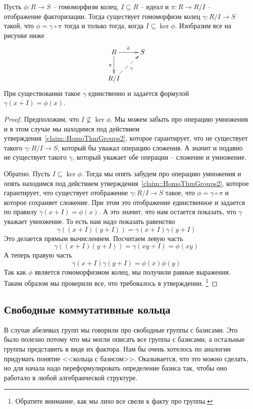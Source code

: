 \begin{claim}
Пусть $\phi\colon R\to S$ -- гомоморфизм колец, $I\subseteq R$ -- идеал и $\pi \colon R\to R/I$ -- отображение факторизации.
Тогда существует гомоморфизм колец $\gamma \colon R/I \to S$ такой, что $\phi = \gamma \circ \pi$ тогда и только тогда, когда $I 
\subseteq \ker \phi$.
Изобразим все на рисунке ниже
\[
\xymatrix{
	{R}\ar[r]^{\phi}\ar[d]_{\pi}&{S}\\
	{R/I}\ar@{-->}[ru]_{\gamma}&{}
}
\]
При существовании такое $\gamma$ единственно и задается формулой $\gamma(x + I) = \phi(x)$.
\end{claim}
\begin{proof}
Предположим, что $I\not\subseteq \ker \phi$.
Мы можем забыть про операцию умножения и в этом случае мы находимся под действием утверждения~\ref{claim::HomoThmGroups2}, которое гарантирует, что не существует такого $\gamma\colon R/I\to S$, который бы уважал операцию сложения.
А значит и подавно не существует такого $\gamma$, который уважает обе операции -- сложение и умножение.

Обратно.
Пусть $I\subseteq \ker \phi$.
Тогда мы опять забудем про операцию умножения и опять находимся под действием утверждения~\ref{claim::HomoThmGroups2}, которое гарантирует, что существует отображение $\gamma \colon R/I \to S$ такое, что $\phi = \gamma\circ \pi$ и которое сохраняет сложение.
При этом это отображение единственное и задается по правилу $\gamma(x + I) = \phi(x)$.
А это значит, что нам остается показать, что $\gamma$ уважает умножение.
То есть нам надо показать равенство
\[
\gamma((x+I) (y+I)) = \gamma(x + I) \gamma(y + I)
\]
Это делается прямым вычислением.
Посчитаем левую часть
\[
\gamma((x+I) (y+I)) = \gamma(xy + I) = \phi(xy)
\]
А теперь правую часть
\[
\gamma(x + I) \gamma(y + I) = \phi(x) \phi(y)
\]
Так как $\phi$ является гомоморфизмом колец, мы получили равные выражения.
Таким образом мы проверили все, что требовалось в утверждении.%
\footnote{Обратите внимание, как мы лихо все свели к факту про группы.}
\end{proof}

\subsection{Свободные коммутативные кольца}

В случае абелевых групп мы говорили про свободные группы с базисами.
Это было полезно потому что мы могли описать все группы с базисами, а остальные группы представить в виде их фактора.
Нам бы очень хотелось по аналогии придумать понятие <<кольца с базисом>>.
Оказывается, что это можно сделать, но для начала надо переформулировать определение базиса так, чтобы оно работало в любой алгебраической структуре.

